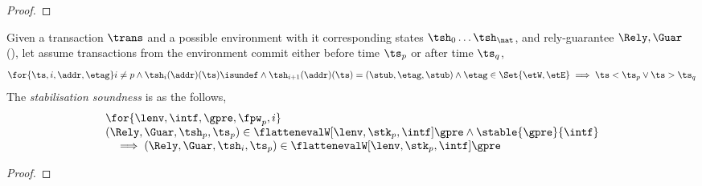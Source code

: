\begin{proof}
\end{proof}

\begin{lem}
\label{lem:stable-sound}

Given a transaction \( \trans \) and a possible environment with it corresponding states \( \tsh_{0} \dots \tsh_{\nat} \), and rely-guarantee \( \Rely, \Guar \) (), let assume transactions from the environment commit either before time \( \ts_{p} \) or after time \( \ts_{q} \),
\[
    \for{\ts,i,\addr,\etag} 
    i \neq p 
    \land \tsh_{i}(\addr)(\ts)\isundef 
    \land \tsh_{i + 1}(\addr)(\ts) = (\stub, \etag, \stub) 
    \land \etag \in \Set{\etW, \etE} 
    \implies \ts < \ts_{p} \lor \ts > \ts_{q}
\]
The \emph{stabilisation soundness} is as the follows,
\[
\begin{array}{@{}l@{}}
    \for{ \lenv, \intf, \gpre, \fpw_{p}, i}  \\
    (\Rely, \Guar, \tsh_{p}, \ts_{p}) \in \flattenevalW[\lenv, \stk_{p}, \intf]{\gpre}
    \land \stable{\gpre}{\intf} \\
    \quad \implies (\Rely, \Guar, \tsh_{i}, \ts_{p}) \in \flattenevalW[\lenv, \stk_{p}, \intf]{\gpre}
\end{array}
\]
\end{lem}
\begin{proof}
\end{proof}

